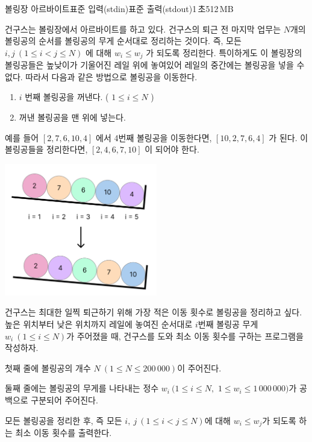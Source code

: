 \begin{problem}{볼링장 아르바이트}{표준 입력(stdin)}{표준 출력(stdout)}{1\,초}{512\,MB}

건구스는 볼링장에서 아르바이트를 하고 있다. 건구스의 퇴근 전 마지막 업무는 $N$개의 볼링공의 순서를 볼링공의 무게 순서대로 정리하는 것이다. 즉, 모든 $i, j\ ( 1 \le i < j \le N )$ 에 대해 $w_i \le w_j$ 가 되도록 정리한다.
특이하게도 이 볼링장의 볼링공들은 높낮이가 기울어진 레일 위에 놓여있어 레일의 중간에는 볼링공을 넣을 수 없다. 따라서 다음과 같은 방법으로 볼링공을 이동한다.

\begin{enumerate}
    \item $i$ 번째 볼링공을 꺼낸다. ( $1 \le i \le N$ )
    \item 꺼낸 볼링공을 맨 위에 넣는다.
\end{enumerate}

예를 들어 $[2, 7, 6, 10, 4]$ 에서 4번째 볼링공을 이동한다면, $[10, 2, 7, 6, 4]$ 가 된다. 이 볼링공들을 정리한다면, $[2, 4, 6, 7, 10]$ 이 되어야 한다.

\begin{center}
  \includegraphics[width=0.5\textwidth]{../pictures/image.png} \\
\end{center}

건구스는 최대한 일찍 퇴근하기 위해 가장 적은 이동 횟수로 볼링공을 정리하고 싶다. 높은 위치부터 낮은 위치까지 레일에 놓여진 순서대로 $i$번째 볼링공 무게 $w_i\ ( 1 \le i \le N )$가 주어졌을 때, 건구스를 도와 최소 이동 횟수를 구하는 프로그램을 작성하자.


\InputFile
첫째 줄에 볼링공의 개수 $N\ ( 1 \le N \le 200\,000 )$이 주어진다.

둘째 줄에는 볼링공의 무게를 나타내는 정수 $w_i\ ( 1 \le i \le N,$ $1 \le w_i \le 1\,000\,000 )$가 공백으로 구분되어 주어진다.

\OutputFile
모든 볼링공을 정리한 후, 즉 모든 $i,\ j\ ( 1 \le i < j \le N )$에 대해 $w_i \le w_j$가 되도록 하는 최소 이동 횟수를 출력한다.

\Examples

\begin{example}
%
%
%
\end{example}

\end{problem}
